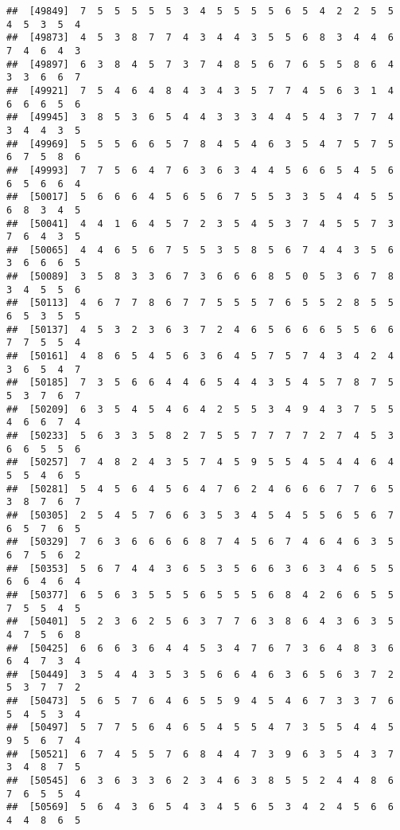 \documentclass[
]{book}
\begin{document}
\begin{verbatim}
##  [49849]  7  5  5  5  5  5  3  4  5  5  5  5  6  5  4  2  2  5  5  4  5  3  5  4
##  [49873]  4  5  3  8  7  7  4  3  4  4  3  5  5  6  8  3  4  4  6  7  4  6  4  3
##  [49897]  6  3  8  4  5  7  3  7  4  8  5  6  7  6  5  5  8  6  4  3  3  6  6  7
##  [49921]  7  5  4  6  4  8  4  3  4  3  5  7  7  4  5  6  3  1  4  6  6  6  5  6
##  [49945]  3  8  5  3  6  5  4  4  3  3  3  4  4  5  4  3  7  7  4  3  4  4  3  5
##  [49969]  5  5  5  6  6  5  7  8  4  5  4  6  3  5  4  7  5  7  5  6  7  5  8  6
##  [49993]  7  7  5  6  4  7  6  3  6  3  4  4  5  6  6  5  4  5  6  6  5  6  6  4
##  [50017]  5  6  6  6  4  5  6  5  6  7  5  5  3  3  5  4  4  5  5  6  8  3  4  5
##  [50041]  4  4  1  6  4  5  7  2  3  5  4  5  3  7  4  5  5  7  3  7  6  4  3  5
##  [50065]  4  4  6  5  6  7  5  5  3  5  8  5  6  7  4  4  3  5  6  3  6  6  6  5
##  [50089]  3  5  8  3  3  6  7  3  6  6  6  8  5  0  5  3  6  7  8  3  4  5  5  6
##  [50113]  4  6  7  7  8  6  7  7  5  5  5  7  6  5  5  2  8  5  5  6  5  3  5  5
##  [50137]  4  5  3  2  3  6  3  7  2  4  6  5  6  6  6  5  5  6  6  7  7  5  5  4
##  [50161]  4  8  6  5  4  5  6  3  6  4  5  7  5  7  4  3  4  2  4  3  6  5  4  7
##  [50185]  7  3  5  6  6  4  4  6  5  4  4  3  5  4  5  7  8  7  5  5  3  7  6  7
##  [50209]  6  3  5  4  5  4  6  4  2  5  5  3  4  9  4  3  7  5  5  4  6  6  7  4
##  [50233]  5  6  3  3  5  8  2  7  5  5  7  7  7  7  2  7  4  5  3  6  6  5  5  6
##  [50257]  7  4  8  2  4  3  5  7  4  5  9  5  5  4  5  4  4  6  4  5  5  4  6  5
##  [50281]  5  4  5  6  4  5  6  4  7  6  2  4  6  6  6  7  7  6  5  3  8  7  6  7
##  [50305]  2  5  4  5  7  6  6  3  5  3  4  5  4  5  5  6  5  6  7  6  5  7  6  5
##  [50329]  7  6  3  6  6  6  6  8  7  4  5  6  7  4  6  4  6  3  5  6  7  5  6  2
##  [50353]  5  6  7  4  4  3  6  5  3  5  6  6  3  6  3  4  6  5  5  6  6  4  6  4
##  [50377]  6  5  6  3  5  5  5  6  5  5  5  6  8  4  2  6  6  5  5  7  5  5  4  5
##  [50401]  5  2  3  6  2  5  6  3  7  7  6  3  8  6  4  3  6  3  5  4  7  5  6  8
##  [50425]  6  6  6  3  6  4  4  5  3  4  7  6  7  3  6  4  8  3  6  6  4  7  3  4
##  [50449]  3  5  4  4  3  5  3  5  6  6  4  6  3  6  5  6  3  7  2  5  3  7  7  2
##  [50473]  5  6  5  7  6  4  6  5  5  9  4  5  4  6  7  3  3  7  6  5  4  5  3  4
##  [50497]  5  7  7  5  6  4  6  5  4  5  5  4  7  3  5  5  4  4  5  9  5  6  7  4
##  [50521]  6  7  4  5  5  7  6  8  4  4  7  3  9  6  3  5  4  3  7  3  4  8  7  5
##  [50545]  6  3  6  3  3  6  2  3  4  6  3  8  5  5  2  4  4  8  6  7  6  5  5  4
##  [50569]  5  6  4  3  6  5  4  3  4  5  6  5  3  4  2  4  5  6  6  4  4  8  6  5

\end{verbatim}
\end{document}
